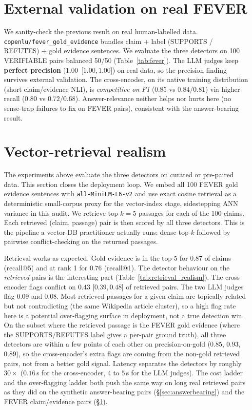 \documentclass[sigconf, nonacm, natbib]{acmart}
\begin{document}
\section{External validation on real FEVER}
\label{sec:fever}
We sanity-check the previous result on real human-labelled data.
\texttt{copenlu/fever\_gold\_evidence} bundles claim + label (SUPPORTS / REFUTES) +
gold evidence sentences. We evaluate the three detectors on 100 VERIFIABLE pairs
balanced 50/50 (Table~\ref{tab:fever}). The LLM judges keep \textbf{perfect precision}
($1.00$~[$1.00,1.00$]) on real data, so the precision finding survives external
validation. The cross-encoder, on its native training distribution (short
claim/evidence NLI), is \emph{competitive on F1} ($0.85$ vs $0.84/0.81$) via higher
recall ($0.80$ vs $0.72/0.68$). Answer-relevance neither helps nor hurts here (no
sense-trap failures to fix on FEVER pairs), consistent with the answer-bearing result.



\section{Vector-retrieval realism}
\label{sec:retrieval}
The experiments above evaluate the three detectors on curated or pre-paired data. This
section closes the deployment loop. We embed all 100 FEVER gold evidence sentences with
\texttt{all-MiniLM-L6-v2} and use exact cosine retrieval as a deterministic small-corpus
proxy for the vector-index stage, sidestepping ANN variance in this audit. We retrieve
top-$k=5$ passages for each of the 100 claims. Each
retrieved (claim, passage) pair is then scored by all three detectors. This is the
pipeline a vector-DB practitioner actually runs: dense top-$k$ followed by pairwise
conflict-checking on the returned passages.

Retrieval works as expected. Gold evidence is in the top-5 for $0.87$ of claims
(recall@5) and at rank 1 for $0.76$ (recall@1). The detector behaviour on the
\emph{retrieved} pairs is the interesting part (Table~\ref{tab:retrieval_realism}).
The cross-encoder flags conflict on $0.43$ [$0.39, 0.48$] of retrieved pairs. The two
LLM judges flag $0.09$ and $0.08$. Most retrieved passages for a given claim are
topically related but not contradicting (the same Wikipedia article cluster), so a
high flag rate here is a potential over-flagging surface in deployment, not a true
detection win.
On the subset where the retrieved passage is the FEVER gold evidence (where the
SUPPORTS/REFUTES label gives a per-pair ground truth), all three detectors are within
a few points of each other on precision-on-gold ($0.85$, $0.93$, $0.89$), so the
cross-encoder's extra flags are coming from the non-gold retrieved pairs, not from a
better gold signal. Latency separates the detectors by roughly $30\times$
($0.16$\,s for the cross-encoder, $4$ to $5$\,s for the LLM judges). The cost ladder
and the over-flagging ladder both push the same way on long real retrieved pairs as
they did on the synthetic answer-bearing pairs (\S\ref{sec:answerbearing}) and the
FEVER claim/evidence pairs (\S\ref{sec:fever}).
\end{document}

